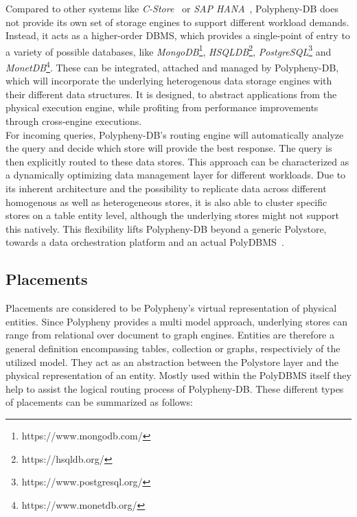 Compared to other systems like \textit{C-Store}~\cite{cstore_2005} or \textit{SAP HANA}~\cite{hana_2012}, 
Polypheny-DB does not provide its own set of storage engines to support 
different workload demands.\\
Instead, it acts as a higher-order DBMS, which provides a single-point of entry to 
a variety of possible databases, like 
\textit{MongoDB}\footnote{https://www.mongodb.com/}, 
\textit{HSQLDB}\footnote{https://hsqldb.org/},
\textit{PostgreSQL}\footnote{https://www.postgresql.org/} 
and \textit{MonetDB}\footnote{https://www.monetdb.org/}. 
These can be integrated, attached and managed by Polypheny-DB, which will incorporate the underlying 
heterogenous data storage engines with their different data structures. 
It is designed, to abstract applications from the physical execution engine, while profiting from 
performance improvements through cross-engine executions. 
\\
For incoming queries, Polypheny-DB's routing engine will automatically analyze the query and decide 
which store will provide the best response. The query is then explicitly routed to these data stores. 
This approach can be characterized as a dynamically optimizing data management layer for different workloads.
Due to its inherent architecture and the possibility to replicate data across different homogenous as well as heterogeneous stores, it is also able to cluster specific stores 
on a table entity level, although the underlying stores might not support this natively. 
This flexibility lifts Polypheny-DB beyond a generic Polystore, towards a data orchestration platform and an actual PolyDBMS~\cite{polypheny2021}. 




\subsection{Placements}
Placements are considered to be Polypheny's virtual representation of physical entities.
Since Polypheny provides a multi model approach, underlying stores can range from relational over document to graph engines. 
Entities are therefore a general definition encompassing tables, collection or graphs, respectiviely of the utilized model.
They act as an abstraction between the Polystore layer and the physical representation of an entity. 
Mostly used within the PolyDBMS itself they help to assist the logical routing process of Polypheny-DB.
These different types of placements can be summarized as follows:



